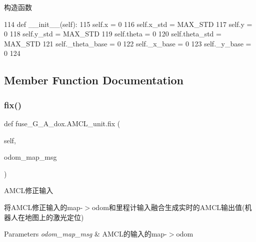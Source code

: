 构造函数 


\begin{DoxyCode}
114     \textcolor{keyword}{def }\_\_init\_\_(self):
115         self.x = 0
116         self.x\_std = MAX\_STD
117         self.y = 0
118         self.y\_std = MAX\_STD
119         self.theta = 0
120         self.theta\_std = MAX\_STD
121         self.\_theta\_base = 0
122         self.\_x\_base = 0
123         self.\_y\_base = 0
124 
\end{DoxyCode}


\subsection{Member Function Documentation}
\mbox{\label{classfuse___g___a__dox_1_1_a_m_c_l__unit_aef7456a0a6ea842a4f63582841f3e172}} 
\subsubsection{\texorpdfstring{fix()}{fix()}}
{\footnotesize\ttfamily def fuse\+\_\+\+G\+\_\+\+A\+\_\+dox.\+A\+M\+C\+L\+\_\+unit.\+fix (\begin{DoxyParamCaption}\item[{}]{self,  }\item[{}]{odom\+\_\+map\+\_\+msg }\end{DoxyParamCaption})}



A\+M\+C\+L修正输入 

将\+A\+M\+C\+L修正输入的map-\/$>$odom和里程计输入融合生成实时的\+A\+M\+C\+L输出值(机器人在地图上的激光定位)


\begin{DoxyParams}{Parameters}
{\em odom\+\_\+map\+\_\+msg} & A\+M\+C\+L的输入的map-\/$>$odom \\
\hline
\end{DoxyParams}

